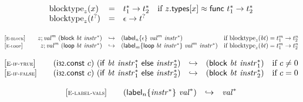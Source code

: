\vspace{1ex}

$$
\begin{array}[t]{@{}lcl@{}l@{}}
{{\mathrm{blocktype}}}_{z}(x) & = & {t_1^\ast} \rightarrow {t_2^\ast} & \quad \mbox{if}~ z{.}\mathsf{types}{}[x] \approx \mathsf{func}~{t_1^\ast} \rightarrow {t_2^\ast} \\
{{\mathrm{blocktype}}}_{z}({t^?}) & = & \epsilon \rightarrow {t^?} \\
\end{array}
$$

$$
\begin{array}[t]{@{}lrcl@{}l@{}}
{[\textsc{\scriptsize E{-}block}]} \quad & z ; {{\mathit{val}}^{m}}~(\mathsf{block}~{\mathit{bt}}~{{\mathit{instr}}^\ast}) & \hookrightarrow & ({{\mathsf{label}}_{n}}{\{ \epsilon \}}~{{\mathit{val}}^{m}}~{{\mathit{instr}}^\ast}) & \quad \mbox{if}~ {{\mathrm{blocktype}}}_{z}({\mathit{bt}}) = {t_1^{m}} \rightarrow {t_2^{n}} \\
{[\textsc{\scriptsize E{-}loop}]} \quad & z ; {{\mathit{val}}^{m}}~(\mathsf{loop}~{\mathit{bt}}~{{\mathit{instr}}^\ast}) & \hookrightarrow & ({{\mathsf{label}}_{m}}{\{ \mathsf{loop}~{\mathit{bt}}~{{\mathit{instr}}^\ast} \}}~{{\mathit{val}}^{m}}~{{\mathit{instr}}^\ast}) & \quad \mbox{if}~ {{\mathrm{blocktype}}}_{z}({\mathit{bt}}) = {t_1^{m}} \rightarrow {t_2^{n}} \\
\end{array}
$$

$$
\begin{array}[t]{@{}lrcl@{}l@{}}
{[\textsc{\scriptsize E{-}if{-}true}]} \quad & (\mathsf{i{\scriptstyle 32}}{.}\mathsf{const}~c)~(\mathsf{if}~{\mathit{bt}}~{{\mathit{instr}}_1^\ast}~\mathsf{else}~{{\mathit{instr}}_2^\ast}) & \hookrightarrow & (\mathsf{block}~{\mathit{bt}}~{{\mathit{instr}}_1^\ast}) & \quad \mbox{if}~ c \neq 0 \\
{[\textsc{\scriptsize E{-}if{-}false}]} \quad & (\mathsf{i{\scriptstyle 32}}{.}\mathsf{const}~c)~(\mathsf{if}~{\mathit{bt}}~{{\mathit{instr}}_1^\ast}~\mathsf{else}~{{\mathit{instr}}_2^\ast}) & \hookrightarrow & (\mathsf{block}~{\mathit{bt}}~{{\mathit{instr}}_2^\ast}) & \quad \mbox{if}~ c = 0 \\
\end{array}
$$

\vspace{1ex}

$$
\begin{array}[t]{@{}lrcl@{}l@{}}
{[\textsc{\scriptsize E{-}label{-}vals}]} \quad & ({{\mathsf{label}}_{n}}{\{ {{\mathit{instr}}^\ast} \}}~{{\mathit{val}}^\ast}) & \hookrightarrow & {{\mathit{val}}^\ast} \\
\end{array}
$$

